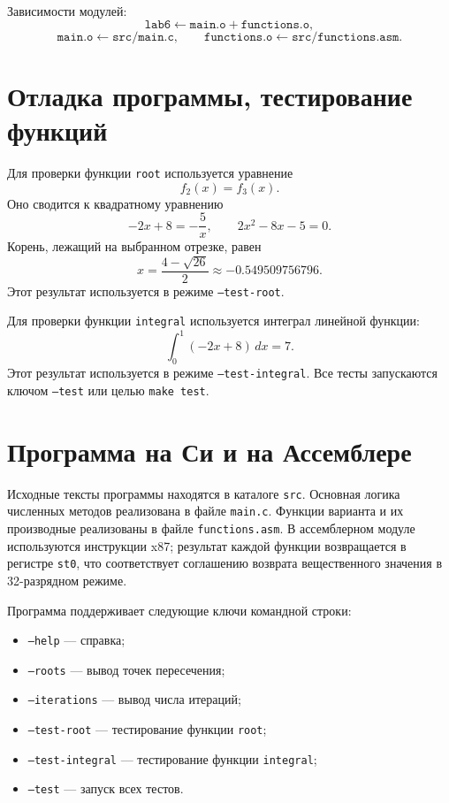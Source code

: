 \documentclass[a4paper,12pt,titlepage,finall]{article}
\begin{document}
Зависимости модулей:
\[
    \texttt{lab6} \leftarrow
    \texttt{main.o}+\texttt{functions.o},
\]
\[
    \texttt{main.o} \leftarrow \texttt{src/main.c},\qquad
    \texttt{functions.o} \leftarrow \texttt{src/functions.asm}.
\]

\newpage

\section{Отладка программы, тестирование функций}

Для проверки функции \texttt{root} используется уравнение
\[
    f_2(x)=f_3(x).
\]
Оно сводится к квадратному уравнению
\[
    -2x+8=-\frac{5}{x},\qquad 2x^2-8x-5=0.
\]
Корень, лежащий на выбранном отрезке, равен
\[
    x=\frac{4-\sqrt{26}}{2}\approx -0.549509756796.
\]
Этот результат используется в режиме \texttt{--test-root}.

Для проверки функции \texttt{integral} используется интеграл линейной
функции:
\[
    \int_0^1(-2x+8)\,dx = 7.
\]
Этот результат используется в режиме \texttt{--test-integral}.
Все тесты запускаются ключом \texttt{--test} или целью \texttt{make test}.

\newpage

\section{Программа на Си и на Ассемблере}

Исходные тексты программы находятся в каталоге \texttt{src}. Основная
логика численных методов реализована в файле \texttt{main.c}. Функции
варианта и их производные реализованы в файле \texttt{functions.asm}.
В ассемблерном модуле используются инструкции x87; результат каждой
функции возвращается в регистре \texttt{st0}, что соответствует
соглашению возврата вещественного значения в 32-разрядном режиме.

Программа поддерживает следующие ключи командной строки:
\begin{itemize}
\item \texttt{--help} --- справка;
\item \texttt{--roots} --- вывод точек пересечения;
\item \texttt{--iterations} --- вывод числа итераций;
\item \texttt{--test-root} --- тестирование функции \texttt{root};
\item \texttt{--test-integral} --- тестирование функции \texttt{integral};
\item \texttt{--test} --- запуск всех тестов.
\end{itemize}
\end{document}

